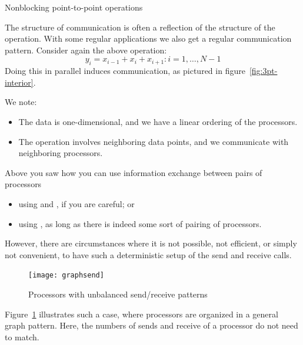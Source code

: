 
 {Nonblocking point-to-point operations}
\label{sec:nonblock}

The structure of communication is often a reflection of the structure
of the operation.
With some regular applications we also get a regular communication pattern.
Consider again the above operation:
\[ y_i=x_{i-1}+x_i+x_{i+1}\colon i=1,\ldots,N-1 \]
Doing this in parallel induces communication, as pictured in figure~\ref{fig:3pt-interior}.


We note:
\begin{itemize}
\item The data is one-dimensional, and we have a linear ordering of the processors.
\item The operation involves neighboring data points, and we communicate
  with neighboring processors.
\end{itemize}

Above you saw how you can use information exchange between pairs of processors
\begin{itemize}
\item using  and , if you are careful; or
\item using , as long as there is indeed some sort of pairing of processors.
\end{itemize}
However, there are circumstances where it is not possible, not efficient, or simply not
convenient, to have such a deterministic setup of the send and receive calls.
%
\begin{figure}[ht]
  \texttt{[image: graphsend]}
  \caption{Processors with unbalanced send/receive patterns}
  \label{fig:graphsend}
\end{figure}
%
Figure~\ref{fig:graphsend} illustrates such a case, where processors are
organized in a general graph pattern. Here, the numbers of sends and receive
of a processor do not need to match.

